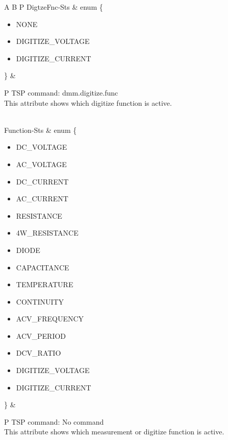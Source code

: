 \documentclass[openany]{article}
\begin{document}
\begin{longtable}{A B P}
		DigtzeFnc-Sts & enum \{\begin{itemize}[noitemsep]
					\small
					\item[] NONE
					\item[] DIGITIZE\_VOLTAGE
					\item[] DIGITIZE\_CURRENT
					\end{itemize}\} & 
				\begin{tabular}{P}
					TSP command: dmm.digitize.func \\
					This attribute shows which digitize function is active.
				\end{tabular} \\ \hline
		Function-Sts & enum \{\begin{itemize}[noitemsep]
					\item[] DC\_VOLTAGE
					\item[] AC\_VOLTAGE
					\item[] DC\_CURRENT
					\item[] AC\_CURRENT
					\item[] RESISTANCE
					\item[] 4W\_RESISTANCE
					\item[] DIODE
					\item[] CAPACITANCE
					\item[] TEMPERATURE
					\item[] CONTINUITY
					\item[] ACV\_FREQUENCY
					\item[] ACV\_PERIOD
					\item[] DCV\_RATIO
					\item[] DIGITIZE\_VOLTAGE
					\item[] DIGITIZE\_CURRENT
					\end{itemize}\} &
				\begin{tabular}{P}
					TSP command: No command \\
					This attribute shows which measurement or digitize function is active.
				\end{tabular} \\ \hline
	\end{longtable}
\end{document}

